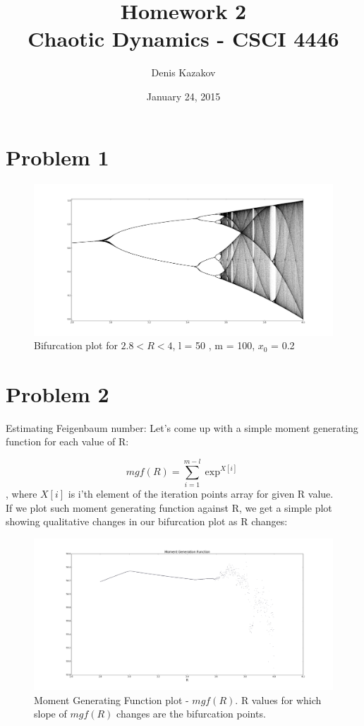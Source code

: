 \documentclass[12pt]{article}\pagestyle{myheadings}
\title{Homework 2 \\ Chaotic Dynamics - CSCI 4446}
\author{Denis Kazakov}
\date{January 24, 2015}
\theoremstyle{plain}
\begin{document}
\maketitle


\section{Problem 1}

\begin{figure}[h!]
\centering
\includegraphics[scale=.3]{nice_bifurcations}
\caption{Bifurcation plot for $2.8 < R < 4$, l = 50 , m = 100, $x_0$ = 0.2}
\label{fig:my_label}
\end{figure}


\section{Problem 2}
Estimating Feigenbaum number:
Let's come up with a simple moment generating function for each value of R:

$$mgf(R) = \sum_{i=1}^{m-l} \exp^{X[i]}$$, where $X[i]$ is i'th element of the iteration points array for given R value. \\

If we plot such moment generating function against R, we get a simple plot showing qualitative changes in our bifurcation plot as R changes:\\

\begin{figure}[h!]
\centering
\includegraphics[scale=.3]{moment_gen_2}
\caption{Moment Generating Function plot - $mgf(R)$. R values for which slope of $mgf(R)$ changes are the bifurcation points. }
\label{fig:my_label}
\end{figure}
\end{document}
